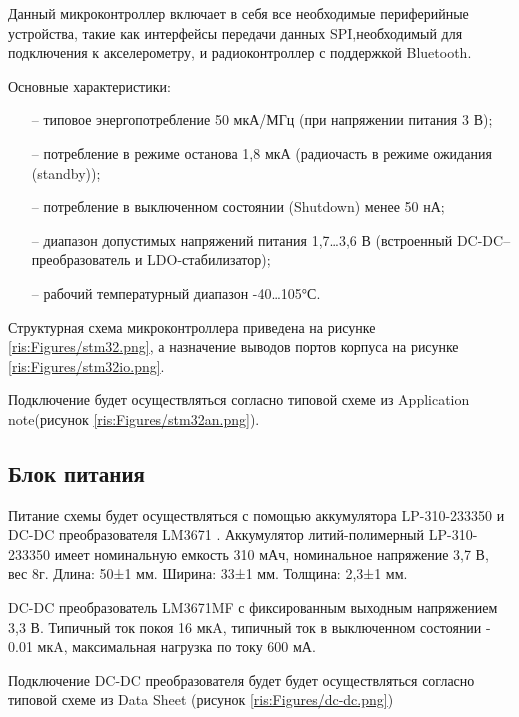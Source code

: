 \begin{sloppypar}
Данный микроконтроллер включает в себя все необходимые периферийные устройства, такие как интерфейсы передачи данных SPI,необходимый для подключения к акселерометру, и радиоконтроллер с поддержкой Bluetooth.

Основные характеристики:
\begin{onehalfspace}
	\begin{itemize}
		\item[--] типовое энергопотребление 50 мкА/МГц (при напряжении питания 3 В);
		\item[--] потребление в режиме останова 1,8 мкА (радиочасть в режиме ожидания (standby));
		\item[--] потребление в выключенном состоянии (Shutdown) менее 50 нА;
		\item[--] диапазон допустимых напряжений питания 1,7…3,6 В (встроенный DC-DC–преобразователь и LDO-стабилизатор);
		\item[--] рабочий температурный диапазон -40…105°С.
	\end{itemize}
\end{onehalfspace}


Структурная схема микроконтроллера приведена на рисунке \ref{ris:Figures/stm32.png}, а назначение выводов портов корпуса на рисунке \ref{ris:Figures/stm32io.png}.





Подключение будет осуществляться согласно типовой схеме из Application note\cite {STM_an}(рисунок \ref{ris:Figures/stm32an.png}).







 











\subsection{Блок питания}
Питание схемы будет осуществляться с помощью аккумулятора LP-310-233350 \cite {li-pol}  и DC-DC преобразователя LM3671 \cite {dc-dc}.
Аккумулятор литий-полимерный LP-310-233350 имеет номинальную емкость 310 мАч, номинальное напряжение 3,7 В, вес 8г. Длина: 50±1 мм. Ширина: 33±1 мм. Толщина: 2,3±1 мм. 


DC-DC преобразователь LM3671MF с фиксированным выходным напряжением 3,3 В. Типичный ток покоя 16 мкA, типичный ток в выключенном состоянии - 0.01 мкA, максимальная нагрузка по току 600 мА.

Подключение DC-DC преобразователя будет будет осуществляться согласно типовой схеме из Data Sheet \cite {dc-dc} (рисунок \ref{ris:Figures/dc-dc.png})





\end{sloppypar}
